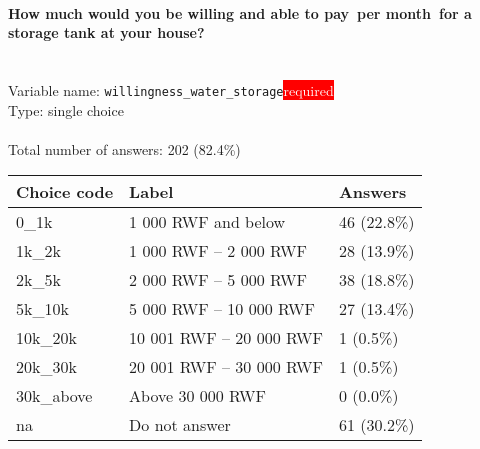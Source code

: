\documentclass[11.5pt, a4paper]{scrartcl}
\begin{document}
\paragraph{How much would you be willing and able to pay per month for a storage tank at your house?}
\  \\Variable name: \texttt{willingness\_water\_storage}\hfill\colorbox{red}{\small{\textcolor{white}{required}}}\\
 Type: single choice\\
\\Total number of answers: 202 (82.4\%)
\\[0.2em] \begin{tabular}{p{4cm}|p{8cm}|p{3cm}}
Choice code & Label & Answers \\
\hline
0\_1k & 1 000 RWF and below& \cellcolor{color1}46 (22.8\%)\\
\cellcolor{mygray} 1k\_2k & \cellcolor{mygray}1 000 RWF – 2 000 RWF & \cellcolor{color0}28 (13.9\%)\\
2k\_5k & 2 000 RWF – 5 000 RWF& \cellcolor{color0}38 (18.8\%)\\
\cellcolor{mygray} 5k\_10k & \cellcolor{mygray}5 000 RWF – 10 000 RWF & \cellcolor{color0}27 (13.4\%)\\
10k\_20k & 10 001 RWF – 20 000 RWF& \cellcolor{color0}1 (0.5\%)\\
\cellcolor{mygray} 20k\_30k & \cellcolor{mygray}20 001 RWF – 30 000 RWF & \cellcolor{color0}1 (0.5\%)\\
30k\_above & Above 30 000 RWF& \cellcolor{color0}0 (0.0\%)\\
\cellcolor{mygray} na & \cellcolor{mygray}Do not answer & \cellcolor{color1}61 (30.2\%)\\
\end{tabular}
\end{document}
